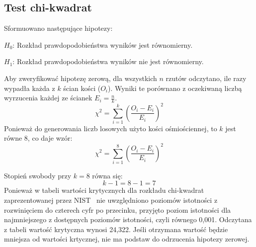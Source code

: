 \subsection{Test chi-kwadrat}
Sformuowano następujące hipotezy:
\par \begin{math} H_0 \end{math}: Rozkład prawdopodobieństwa wyników jest równomierny.
\par \begin{math} H_1 \end{math}: Rozkład prawdopodobieństwa wyników nie jest równomierny.
\par Aby zweryfikować hipotezę zerową, dla wszystkich \begin{math} n \end{math} rzutów odczytano, ile razy wypadła każda z 
\begin{math} k \end{math} ścian kości (\begin{math}O_i\end{math}). Wyniki te porównano z oczekiwaną
liczbą wyrzucenia każdej ze ścianek \begin{math}E_i = \frac{n}{k}\end{math}. 
\begin{displaymath}
    \chi^2 = \sum_{i=1}^{k} \left( \frac{O_i - E_i}{E_i} \right)^2
\end{displaymath}
Ponieważ do generowania liczb losowych użyto kości ośmiościennej, to \begin{math} k \end{math} jest równe 8, co daje wzór:
\begin{displaymath}
    \chi^2 = \sum^{8}_{i=1} \left( \frac{O_i - E_i}{E_i} \right)^2
\end{displaymath}
\par Stopień swobody przy \begin{math} k = 8 \end{math} równa się:
\begin{displaymath}
    k - 1 = 8 - 1 = 7
\end{displaymath}
Ponieważ w tabeli wartości krytycznych dla rozkładu chi-kwadrat zaprezentowanej przez NIST~\cite{NIST2012} nie
uwzględniono poziomów istotności z rozwinięciem do czterech cyfr po przecinku, przyjęto poziom istotności dla 
najmniejszego z dostępnych poziomów istotności, czyli równego 0{,}001. Odczytana z tabeli wartość krytyczna wynosi
24{,}322. Jeśli otrzymana wartość będzie mniejsza od wartości krtycznej, nie ma podstaw do odrzucenia 
hipotezy zerowej.


